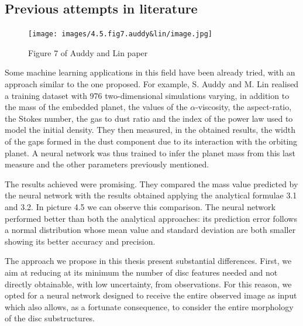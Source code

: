 \documentclass[a4paper,10pt]{report}
\begin{document}
\subsection{Previous attempts in literature}

\begin{figure}
    \begin{center}
        \texttt{[image: images/4.5.fig7.auddy\&lin/image.jpg]}
    \end{center}
    \caption{Figure 7 of Auddy and Lin paper}
\end{figure}

Some machine learning applications in this field have been already tried, 
with an approach similar to the one proposed. For example,
S. Auddy and M. Lin \cite{Auddy_2020} realised a training dataset with 976 two-dimensional simulations varying, in addition to the mass of the embedded planet, the values of the $\alpha$-viscosity, the aspect-ratio, the Stokes number, the gas to dust ratio and the index of the power law used to model 
the initial density. 
They then measured, in the obtained results, the width of the gaps formed in the
dust component due to its interaction with the orbiting planet. A neural network
was thus trained to infer the planet mass from this last measure and the other parameters previously mentioned.

The results achieved were promising. They compared the mass value predicted by the neural network
with the results obtained applying the analytical formulae 3.1 and 3.2.
In picture 4.5 we can observe this comparison.
The neural network performed better than both the analytical approaches: its prediction error
follows a normal distribution whose mean value and standard deviation are both smaller showing its
better accuracy and precision.

The approach we propose in this thesis present substantial differences. 
First, we aim at reducing at its minimum the number of disc features needed and not 
directly obtainable, with low uncertainty, from observations.
For this reason, we opted for a neural network designed to receive the entire
observed image as input which also allows, as a fortunate consequence, to consider the entire morphology of the disc substructures.
\end{document}
